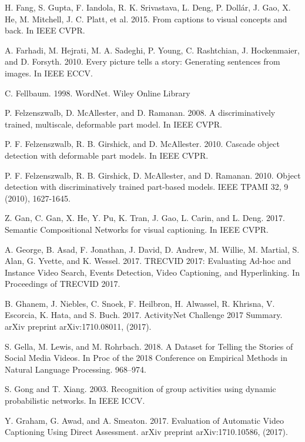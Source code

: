 \documentclass[10pt,journal,compsoc]{IEEEtran}
\begin{document}
\begin{thebibliography}{1}
H. Fang, S. Gupta, F. Iandola, R. K. Srivastava, L. Deng, P. Dollár, J. Gao, X. He, M. Mitchell, J. C. Platt, et al. 2015. From captions to visual concepts and back. In IEEE CVPR.

A. Farhadi, M. Hejrati, M. A. Sadeghi, P. Young, C. Rashtchian, J. Hockenmaier, and D. Forsyth. 2010. Every picture tells a story: Generating sentences from images. In IEEE ECCV.

C. Fellbaum. 1998. WordNet. Wiley Online Library

P. Felzenszwalb, D. McAllester, and D. Ramanan. 2008. A discriminatively trained, multiscale, deformable part model. In IEEE CVPR.

P. F. Felzenszwalb, R. B. Girshick, and D. McAllester. 2010. Cascade object detection with deformable part models. In IEEE CVPR.

P. F. Felzenszwalb, R. B. Girshick, D. McAllester, and D. Ramanan. 2010. Object detection with discriminatively trained part-based models. IEEE TPAMI 32, 9 (2010), 1627-1645.

Z. Gan, C. Gan, X. He, Y. Pu, K. Tran, J. Gao, L. Carin, and L. Deng. 2017. Semantic Compositional Networks for visual captioning. In IEEE CVPR.

A. George, B. Asad, F. Jonathan, J. David, D. Andrew, M. Willie, M. Martial, S. Alan, G. Yvette, and K. Wessel. 2017. TRECVID 2017: Evaluating Ad-hoc and Instance Video Search, Events
Detection, Video Captioning, and Hyperlinking. In Proceedings of TRECVID 2017.

B. Ghanem, J. Niebles, C. Snoek, F. Heilbron, H. Alwassel, R. Khrisna, V. Escorcia, K. Hata, and S. Buch. 2017. ActivityNet Challenge 2017 Summary. arXiv preprint arXiv:1710.08011,
(2017).

S. Gella, M. Lewis, and M. Rohrbach. 2018. A Dataset for Telling the Stories of Social Media Videos. In Proc of the 2018 Conference on Empirical Methods in Natural Language Processing. 968–974.

S. Gong and T. Xiang. 2003. Recognition of group activities using dynamic probabilistic networks. In IEEE ICCV. %

Y. Graham, G. Awad, and A. Smeaton. 2017. Evaluation of Automatic Video Captioning Using Direct Assessment. arXiv preprint arXiv:1710.10586, (2017).


\end{thebibliography}
\end{document}
